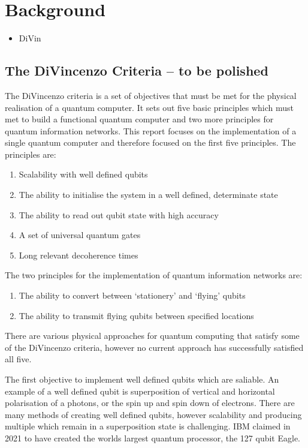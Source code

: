\section{Background}
\begin{itemize}
    \item DiVin
\end{itemize}

\subsection{The DiVincenzo Criteria -- to be polished}
The DiVincenzo criteria is a set of objectives that must be met for the physical realisation of a quantum computer. 
It sets out five basic principles which must met to build a functional quantum computer and two more principles for quantum information networks. \cite{bergou_quantum_2021}
This report focuses on the implementation of a single quantum computer and therefore focused on the first five principles.
The principles are:
\begin{enumerate}
    \item Scalability with well defined qubits
    \item The ability to initialise the system in a well defined, determinate state
    \item The ability to read out qubit state with high accuracy
    \item A set of universal quantum gates
    \item Long relevant decoherence times
    \setcounter{enumTemp}{\theenumi}
\end{enumerate}
The two principles for the implementation of quantum information networks are:
\begin{enumerate}
    \setcounter{enumi}{\theenumTemp}
    \item The ability to convert between `stationery' and `flying' qubits
    \item The ability to transmit flying qubits between specified locations
\end{enumerate}

There are various physical approaches for quantum computing that satisfy some of the DiVincenzo criteria, however no current approach has successfully satisfied all five.
\vspace{1em}

The first objective to implement well defined qubits which are saliable. An example of a well defined qubit is superposition of vertical and horizontal polarisation of a photons, or the spin up and spin down of electrons. 
There are many methods of creating well defined qubits, however scalability and producing multiple which remain in a superposition state is challenging.
IBM claimed in 2021 to have created the worlds largest quantum processor, the 127 qubit Eagle. \cite{authorfullname_ibm_nodate}
\vspace{1em}

